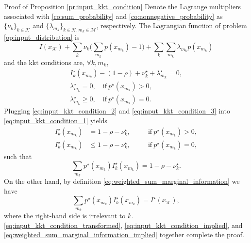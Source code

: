 \documentclass[journal]{IEEEtran}
\begin{document}
\begin{appendix}
	\begin{subsection}{Proof of Proposition \ref{pr:input_kkt_condition}}
		Denote the Lagrange multipliers associated with \eqref{co:sum_probability} and \eqref{co:nonnegative_probability} as $\{\nu_k\}_{k \in \mathcal{K}}$ and $\{\lambda_{m_k}\}_{k \in \mathcal{K},m_k \in \mathcal{M}}$, respectively.
		The Lagrangian function of problem \eqref{op:input_distribution} is
		\begin{equation}
			I(x_{\mathcal{K}}) + \sum_k \nu_k \biggl( \sum_{m_k} p(x_{m_k}) - 1 \biggr) + \sum_k \sum_{m_k} \lambda_{m_k} p(x_{m_k})
		\end{equation}
		and the \gls{kkt} conditions are, $\forall k,m_k$,
		\begin{subequations}
			\label{eq:input_kkt_condition_original}
			\begin{gather}
				I_k^\star(x_{m_k}) - (1 - \rho) + \nu_k^\star + \lambda_{m_k}^\star = 0, \label{eq:input_kkt_condition_1} \\
				\lambda_{m_k}^\star = 0, \quad    \text{if} \ p^\star(x_{m_k}) > 0, \label{eq:input_kkt_condition_2} \\
				\lambda_{m_k}^\star \ge 0, \quad  \text{if} \ p^\star(x_{m_k}) = 0 \label{eq:input_kkt_condition_3}.
			\end{gather}
		\end{subequations}
		Plugging \eqref{eq:input_kkt_condition_2} and \eqref{eq:input_kkt_condition_3} into \eqref{eq:input_kkt_condition_1} yields
		\begin{subequations}
			\label{eq:input_kkt_condition_transformed}
			\begin{alignat}{2}
				I_k^\star(x_{m_k}) & = 1 - \rho - \nu_k^\star, \quad   &  & \text{if} \ p^\star(x_{m_k}) > 0,\label{eq:probable_states_marginal} \\
				I_k^\star(x_{m_k}) & \le 1 - \rho - \nu_k^\star, \quad &  & \text{if} \ p^\star(x_{m_k}) = 0,\label{eq:dropped_states_marginal}
			\end{alignat}
		\end{subequations}
		such that
		\begin{equation}
			\sum_{m_k} p^\star(x_{m_k}) I_k^\star(x_{m_k}) = 1 - \rho - \nu_k^\star.
			\label{eq:input_kkt_condition_implied}
		\end{equation}
		On the other hand, by definition \eqref{eq:weighted_sum_marginal_information} we have
		\begin{equation}
			\sum_{m_k} p^\star(x_{m_k}) I_k^\star(x_{m_k}) = I^\star(x_{\mathcal{K}}),
			\label{eq:weighted_sum_marginal_information_implied}
		\end{equation}
		where the right-hand side is irrelevant to $k$.
		\eqref{eq:input_kkt_condition_transformed}, \eqref{eq:input_kkt_condition_implied}, and \eqref{eq:weighted_sum_marginal_information_implied} together complete the proof.
		\label{ap:input_kkt_condition}
	\end{subsection}


\end{appendix}
\end{document}
